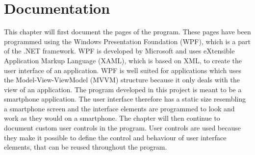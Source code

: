\chapter{Documentation}
This chapter will first document the pages of the program. These pages have been programmed using the Windows Presentation Foundation (WPF), which is a part of the .NET framework. WPF is developed by Microsoft and uses eXtensible Application Markup Language (XAML), which is based on XML, to create the user interface of an application. WPF is well suited for applications which uses the Model-View-ViewModel (MVVM) structure because it only deals with the view of an application. The program developed in this project is meant to be a smartphone application. The user interface therefore has a static size resembling a smartphone screen and the interface elements are programmed to look and work as they would on a smartphone. The chapter will then continue to document custom user controls in the program. User controls are used because they make it possible to define the control and behaviour of user interface elements, that can be reused throughout the program.